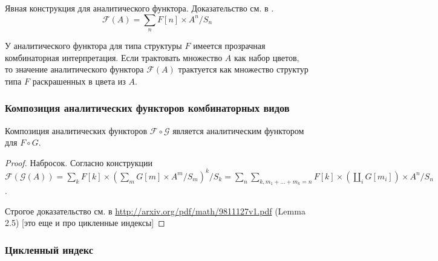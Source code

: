 Явная конструкция для аналитического функтора. Доказательство см. в
\cite{BergTrees}.
\begin{equation}
\label{eq:an}
	\mathcal F(A) = \sum\limits_n F[n] \times A^n / S_n
\end{equation}

У аналитического функтора для типа структуры $F$ имеется прозрачная
комбинаторная интерпретация.
Если трактовать множество $A$ как набор цветов,
то значение аналитического функтора $\mathcal F(A)$ трактуется как множество структур типа $F$
раскрашенных в цвета из $A$.

\subsubsection{Композиция аналитических функторов комбинаторных видов}
\begin{theorem}
Композиция аналитических функторов $\mathcal F \circ \mathcal G$ является
аналитическим функтором для $F \circ G$.
\end{theorem}
\begin{proof}
Набросок. Согласно конструкции $\mathcal F(\mathcal
G (A)) = \sum\limits_k F[k] \times (\sum\limits_m G[m] \times A^m / S_m)^k /
S_k = \sum\limits_n \sum\limits_{k, m_1 + \dots + m_k = n} F[k] \times
(\coprod\limits_{i} G[m_i]) \times A^n / S_n$.

Строгое доказательство см. в \url{http://arxiv.org/pdf/math/9811127v1.pdf}
(Lemma 2.5) [это еще и про цикленные индексы]
\end{proof}

\subsubsection{Цикленный индекс}
\label{sec:cycle}

